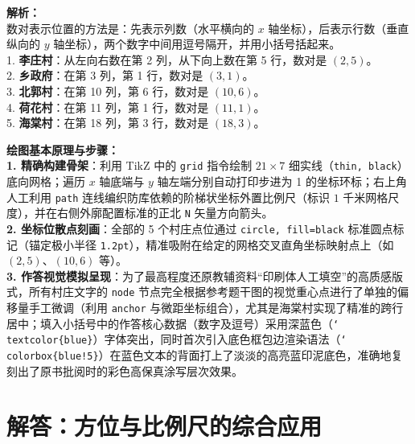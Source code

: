 \vspace{0.8cm}

{\small\color{gray}
\textbf{解析：}\\
数对表示位置的方法是：先表示列数（水平横向的 $x$ 轴坐标），后表示行数（垂直纵向的 $y$ 轴坐标），两个数字中间用逗号隔开，并用小括号括起来。\\
1. \textbf{李庄村}：从左向右数在第 2 列，从下向上数在第 5 行，数对是 $(2, 5)$。\\
2. \textbf{乡政府}：在第 3 列，第 1 行，数对是 $(3, 1)$。\\
3. \textbf{北郭村}：在第 10 列，第 6 行，数对是 $(10, 6)$。\\
4. \textbf{荷花村}：在第 11 列，第 1 行，数对是 $(11, 1)$。\\
5. \textbf{海棠村}：在第 18 列，第 3 行，数对是 $(18, 3)$。
}

\vspace{0.6cm}

{\small\color{blue!70!black}
\textbf{绘图基本原理与步骤：}\\
\textbf{1. 精确构建骨架}：利用 TikZ 中的 \texttt{grid} 指令绘制 $21 \times 7$ 细实线（\texttt{thin, black}）底向网格；遍历 $x$ 轴底端与 $y$ 轴左端分别自动打印步进为 1 的坐标环标；右上角人工利用 \texttt{path} 连线编织防库依赖的阶梯状坐标外置比例尺（标识 $1$ 千米网格尺度），并在右侧外廓配置标准的正北 \texttt{N} 矢量方向箭头。\\
\textbf{2. 坐标位散点刻画}：全部的 5 个村庄点位通过 \texttt{circle, fill=black} 标准圆点标记（锚定极小半径 \texttt{1.2pt}），精准吸附在给定的网格交叉直角坐标映射点上（如 $(2,5)、(10,6)$ 等）。\\
\textbf{3. 作答视觉模拟呈现}：为了最高程度还原教辅资料“印刷体人工填空”的高质感版式，所有村庄文字的 \texttt{node} 节点完全根据参考题干图的视觉重心点进行了单独的偏移量手工微调（利用 \texttt{anchor} 与微距坐标组合），尤其是海棠村实现了精准的跨行居中；填入小括号中的作答核心数据（数字及逗号）采用深蓝色（\texttt{\char`\\textcolor\{blue\}}）字体突出，同时首次引入底色框包边渲染语法（\texttt{\char`\\colorbox\{blue!5\}}）在蓝色文本的背面打上了淡淡的高亮蓝印泥底色，准确地复刻出了原书批阅时的彩色高保真涂写层次效果。
}

\vspace{0.8cm}
\vspace{0.8cm}



\section{解答：方位与比例尺的综合应用}

